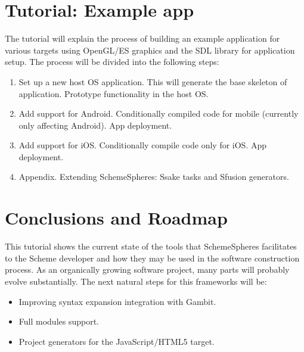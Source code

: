 \documentclass{acm_proc_article-sp}
\begin{document}
\section{Tutorial: Example app}

The tutorial will explain the process of building an example application for various targets using OpenGL/ES graphics and the SDL library for application setup. The process will be divided into the following steps:

\begin{enumerate}
  \item Set up a new host OS application. This will generate the base skeleton of application. Prototype functionality in the host OS.
  \item Add support for Android. Conditionally compiled code for mobile (currently only affecting Android). App deployment.
  \item Add support for iOS. Conditionally compile code only for iOS. App deployment.
  \item Appendix. Extending SchemeSpheres: Ssake tasks and Sfusion generators.
\end{enumerate}


\section{Conclusions and Roadmap}

This tutorial shows the current state of the tools that SchemeSpheres facilitates to the Scheme developer and how they may be used in the software construction process. As an organically growing software project, many parts will probably evolve substantially. The next natural steps for this frameworks will be:

\begin{itemize}
  \item Improving syntax expansion integration with Gambit.
  \item Full modules support.
  \item Project generators for the JavaScript/HTML5 target.
\end{itemize}

\balancecolumns
\end{document}
